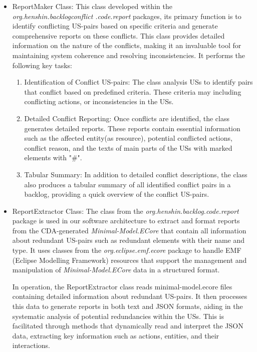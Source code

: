 \begin{itemize}
	\item ReportMaker Class: This class developed within the \textit{org.henshin.backlogconflict .code.report} packages, its primary function is to identify conflicting US-pairs based on specific criteria and generate comprehensive reports on these conflicts. This class provides detailed information on the nature of the conflicts, making it an invaluable tool for maintaining system coherence and resolving inconsistencies. It performs the following key tasks:
	\begin{enumerate}
		\item Identification of Conflict US-pairs: The class analysis USs to identify pairs that conflict based on predefined criteria. These criteria may including conflicting actions, or inconsistencies in the USs.
		
		\item Detailed Conflict Reporting: Once conflicts are identified, the class generates detailed reports. These reports contain essential information such as the affected entity(as resource), potential conflicted actions, conflict reason, and the texts of main parts of the USs with marked elements with "\#".
		
		\item Tabular Summary: In addition to detailed conflict descriptions, the class also produces a tabular summary of all identified conflict pairs in a backlog, providing a quick overview of the conflict US-pairs.
	\end{enumerate}
	
	\item ReportExtractor Class: The class from the \textit{org.henshin.backlog.code.report} package is used in our software architecture to extract and format reports from the CDA-generated \textit{Minimal-Model.ECore} that contain all information about redundant US-pairs such as redundant elements with their name and type. It uses classes from the \textit{org.eclipse.emf.ecore} package to handle EMF (Eclipse Modelling Framework) resources that support the management and manipulation of \textit{Minimal-Model.ECore} data in a structured format.
	
	In operation, the ReportExtractor class reads minimal-model.ecore files containing detailed information about redundant US-pairs. It then processes this data to generate reports in both text and JSON formats, aiding in the systematic analysis of potential redundancies within the USs. This is facilitated through methods that dynamically read and interpret the JSON data, extracting key information such as actions, entities, and their interactions.
	

\end{itemize}
